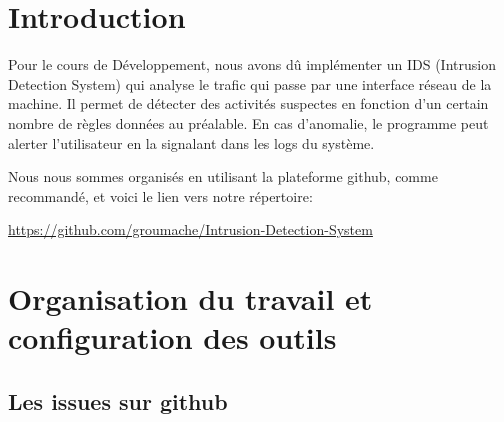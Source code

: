 \documentclass[a4paper]{article}
\begin{document}
\let\cleardoublepage\clearpage










\section{Introduction}



Pour le cours de Développement, nous avons dû implémenter un IDS (Intrusion Detection System) qui analyse le trafic qui passe par une interface réseau de la machine. Il permet de détecter des activités suspectes en fonction d'un certain nombre de règles données au préalable. En cas d'anomalie, le programme peut alerter l'utilisateur en la signalant dans les logs du système.

Nous nous sommes organisés en utilisant la plateforme github, comme recommandé, et voici le lien vers notre répertoire: 
\begin{center}
    {\small \url{https://github.com/groumache/Intrusion-Detection-System}}
\end{center}










\section{Organisation du travail et configuration des outils}





\subsection{Les issues sur github}
\end{document}
